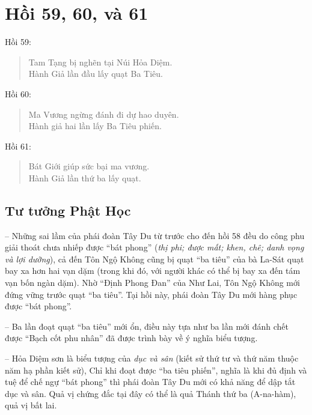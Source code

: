 \chapter{Hồi 59, 60, và 61} %
\label{cha:hoi_59_60}

Hồi 59:

\begin{verse}
\begin{itshape}
Tam Tạng bị nghẽn tại Núi Hỏa Diệm.\\
Hành Giả lần đầu lấy quạt Ba Tiêu.
\end{itshape}
\end{verse}

Hồi 60:

\begin{verse}
\begin{itshape}
Ma Vương ngừng đánh đi dự hao duyên.\\
Hành giả hai lần lấy Ba Tiêu phiến.
\end{itshape}
\end{verse}

Hồi 61:

\begin{verse}
\begin{itshape}
Bát Giới giúp sức bại ma vương.\\
Hành Giả lần thứ ba lấy quạt.
\end{itshape}
\end{verse}

\section{Tư tưởng Phật Học} %
\label{sec:59_60_phat_hoc}

-- Những sai lầm của phái đoàn Tây Du từ trước cho đến hồi 58 đều do công phu giải thoát chưa nhiếp được ``bát phong'' (\emph{thị phi; được mất; khen, chê; danh vọng và lợi dưỡng}), cả đến Tôn Ngộ Không cũng bị quạt ``ba tiêu'' của bà La-Sát quạt bay xa hơn hai vạn dặm (trong khi đó, với người khác có thể bị bay xa đến tám vạn bốn ngàn dặm). Nhờ ``Định Phong Đan'' của Như Lai, Tôn Ngộ Không mới đứng vững trước quạt ``ba tiêu''. Tại hồi này, phái đoàn Tây Du mới hàng phục được ``bát phong''.

-- Ba lần đoạt quạt ``ba tiêu'' mới ổn, điều này tựa như ba lần mới đánh chết được ``Bạch cốt phu nhân'' đã được trình bày về ý nghĩa biểu tượng.

-- Hỏa Diệm sơn là biểu tượng của \emph{dục và sân} (kiết sử thứ tư và thứ năm thuộc năm hạ phần kiết sử), Chỉ khi đoạt được ``ba tiêu phiến'', nghĩa là khi đủ định và tuệ để chế ngự ``bát phong'' thì phái đoàn Tây Du mới có khả năng để dập tắt dục và sân. Quả vị chứng đắc tại đây có thể là quả Thánh thứ ba (A-na-hàm), quả vị bất lai.


